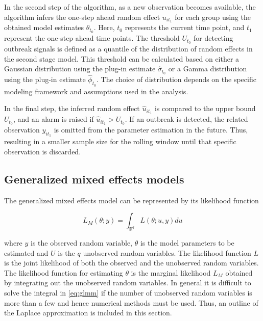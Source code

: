 \documentclass[preprint, 3p,
authoryear]{elsarticle} %
\begin{document}
In the second step of the algorithm, as a new observation becomes
available, the algorithm infers the one-step ahead random effect
\(u_{it_1}\) for each group using the obtained model estimates
\(\theta_{t_0}\). Here, \(t_0\) represents the current time point, and
\(t_1\) represent the one-step ahead time points. The threshold
\(U_{t_0}\) for detecting outbreak signals is defined as a quantile of
the distribution of random effects in the second stage model. This
threshold can be calculated based on either a Gaussian distribution
using the plug-in estimate \(\hat{\sigma}_{t_0}\) or a Gamma
distribution using the plug-in estimate \(\hat{\phi}_{t_0}\). The choice
of distribution depends on the specific modeling framework and
assumptions used in the analysis.

In the final step, the inferred random effect \(\hat{u}_{it_1}\) is
compared to the upper bound \(U_{t_0}\), and an alarm is raised if
\(\hat{u}_{it_1}>U_{t_0}\). If an outbreak is detected, the related
observation \(y_{it_1}\) is omitted from the parameter estimation in the
future. Thus, resulting in a smaller sample size for the rolling window
until that specific observation is discarded.

\hypertarget{generalized-mixed-effects-models}{%
\subsection{\texorpdfstring{Generalized mixed effects models
\label{glmm}}{Generalized mixed effects models }}\label{generalized-mixed-effects-models}}

The generalized mixed effects model can be represented by its likelihood
function

\begin{equation}\label{eq:glmm}
  L_{M}(\theta; y)=\int_{\mathbb{R}^{q}} L(\theta;u,y) du
\end{equation}

where \(y\) is the observed random variable, \(\theta\) is the model
parameters to be estimated and \(U\) is the \(q\) unobserved random
variables. The likelihood function \(L\) is the joint likelihood of both
the observed and the unobserved random variables. The likelihood
function for estimating \(\theta\) is the marginal likelihood \(L_{M}\)
obtained by integrating out the unobserved random variables. In general
it is difficult to solve the integral in \eqref{eq:glmm} if the number
of unobserved random variables is more than a few and hence numerical
methods must be used. Thus, an outline of the Laplace approximation is
included in this section.
\end{document}
